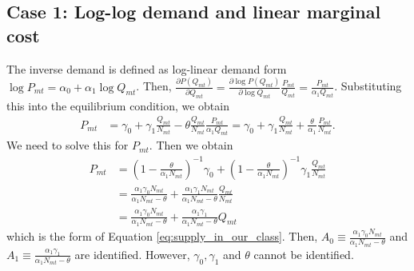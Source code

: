 \documentclass[11pt]{article}
\begin{document}
\subsection{Case 1: Log-log demand and linear marginal cost}
The inverse demand is defined as log-linear demand form $\log P_{mt}=\alpha_0+\alpha_1 \log Q_{mt}$. Then, $\frac{\partial P\left(Q_{m t}\right)}{\partial Q_{mt}}=\frac{\partial \log P\left(Q_{m t}\right)}{\partial \log Q_{mt}}\frac{P_{mt}}{Q_{mt}}=\frac{P_{mt}}{\alpha_1 Q_{mt}}$. Substituting this into the equilibrium condition, we obtain
    \begin{align}
        P_{m t}&=\gamma_0+\gamma_1 \frac{Q_{mt}}{N_{mt}}-\theta \frac{Q_{mt}}{N_{mt}}\frac{P_{mt}}{\alpha_1 Q_{mt}}=\gamma_0+\gamma_1 \frac{Q_{mt}}{N_{mt}}+ \frac{\theta}{\alpha_1}\frac{P_{mt}}{N_{mt}}.
    \end{align}
    We need to solve this for $P_{mt}$. Then we obtain
    \begin{align*}
        P_{m t}&=\left(1-\frac{\theta}{\alpha_1 N_{mt}}\right)^{-1}\gamma_0+\left(1-\frac{\theta}{\alpha_1 N_{mt}}\right)^{-1}\gamma_1 \frac{Q_{mt}}{N_{mt}}\\ 
        & =\frac{\alpha_1 \gamma_0 N_{mt}}{\alpha_1 N_{mt}-\theta}+\frac{\alpha_1 \gamma_1 N_{mt}}{\alpha_1 N_{mt}-\theta} \frac{Q_{mt}}{N_{mt}}\\
        & =\frac{\alpha_1 \gamma_0 N_{mt}}{\alpha_1 N_{mt}-\theta}+\frac{\alpha_1 \gamma_1}{\alpha_1 N_{mt}-\theta} Q_{mt}
    \end{align*}
    which is the form of Equation \eqref{eq:supply_in_our_class}.
    Then, $A_0\equiv\frac{\alpha_1 \gamma_0 N_{mt}}{\alpha_1 N_{mt}-\theta}$ and $A_1\equiv\frac{\alpha_1 \gamma_1}{\alpha_1 N_{mt}-\theta}$ are identified. However, $\gamma_0,\gamma_1$ and $\theta$ cannot be identified. 
\end{document}
